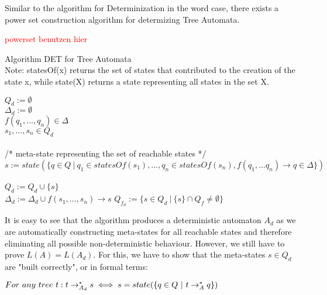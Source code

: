 \documentclass{llncs}
\begin{document}
Similar to the algorithm for Determinization in the word case, there exists a power set construction algorithm for determizing Tree Automata.

\textcolor{red}{powerset benutzen hier}

\begin{definition}{Algorithm DET for Tree Automata \cite{tata-nfta}}\\
	Note: statesOf(x) returns the set of states that contributed to the creation of the state x, while state(X) returns a state representing all states in the set X.
\begin{algorithm}[H]
	\(Q_d := \emptyset\)\\
	\(\Delta_d := \emptyset\)
	\\
		 {
			\( f(q_1,...,q_n) \in \Delta\)\\
			\(s_1,...,s_n \in Q_d\)\\
			~\\
			/* meta-state representing the set of reachable states */ \\
			\( s := state(\{ q \in Q ~|~ q_1 \in statesOf(s_1),..., q_n \in statesOf(s_n), f(q_1,...q_n) \rightarrow q \in \Delta \}) \)\\~\\
			\(Q_d := Q_d \cup \{s\}\)\\
			\(\Delta_d := \Delta_d \cup f(s_1,...,s_n) \rightarrow s \)
		}
	\(Q_{f_d} := \{ s \in Q_d ~ | ~ \{s\} \cap Q_f \neq \emptyset \}\)\\
\end{algorithm}
\end{definition}

\pagebreak

It is easy to see that the algorithm produces a deterministic automaton \(A_d\) as we are automatically constructing meta-states for all reachable states and therefore eliminating all possible non-deterministic behaviour. However, we still have to prove \(L(A) = L(A_d)\). For this, we have to show that the meta-states \(s \in Q_d\) are "built correctly", or in formal terms:

\begin{center}
	\(For~any~tree~t: t \rightarrow_{A_d}^* s \iff s = state(\{q \in Q ~|~ t \rightarrow_A^* q\})\)
\end{center}
\end{document}
